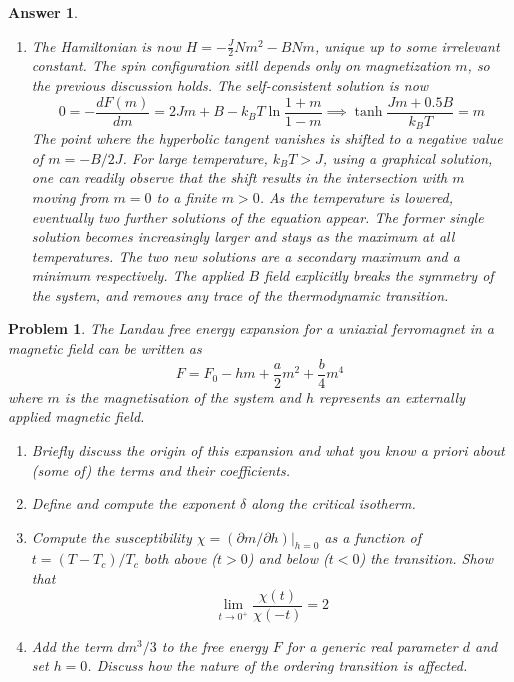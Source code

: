\documentclass[a4paper]{article}
\newtheorem{ans}{Answer}[section]
\theoremstyle{new}
\newtheorem{qns}{Problem}[section]
\begin{document}
\begin{ans}
\begin{enumerate}[label=(\alph*)]
\begin{align}
\end{align}
and so $\alpha(T)=k_BT-J=k_B(T-T_c)$, $\beta(T)=\frac{1}{3}k_BT$. $\alpha(T_c)=0$ indeed, with $\alpha>0$ above $m=0$ and $\alpha<0$ below $m=\pm m_0$.
\item The Hamiltonian is now $H=-\frac{J}{2}Nm^2-BNm$, unique up to some irrelevant constant. The spin configuration sitll depends only on magnetization $m$, so the previous discussion holds. The self-consistent solution is now
$$0=-\frac{dF(m)}{dm}=2Jm+B-k_BT\ln\frac{1+m}{1-m}\implies\tanh\frac{Jm+0.5B}{k_BT}=m$$
The point where the hyperbolic tangent vanishes is shifted to a negative value of $m=-B/2J$. For large temperature, $k_BT>J$, using a graphical solution, one can readily observe that the shift results in the intersection with $m$ moving from $m=0$ to a finite $m>0$. As the temperature is lowered, eventually two further solutions of the equation appear. The former single solution becomes increasingly larger and stays as the maximum at all temperatures. The two new solutions are a secondary maximum and a minimum respectively. The applied $B$ field explicitly breaks the symmetry of the system, and removes any trace of the thermodynamic transition.
\end{enumerate}
\end{ans}
\begin{qns}
The Landau free energy expansion for a uniaxial ferromagnet in a magnetic field can be written as
$$F=F_0-hm+\frac{a}{2}m^2+\frac{b}{4}m^4$$
where $m$ is the magnetisation of the system and $h$ represents an externally applied magnetic field.
\begin{enumerate}[label=(\alph*)]
\item Briefly discuss the origin of this expansion and what you know a priori about (some of) the terms and their coefficients.
\item Define and compute the exponent $\delta$ along the critical isotherm.
\item Compute the susceptibility $\chi=(\partial m/\partial h)|_{h=0}$ as a function of $t = (T − T_c)/T_c$ both above ($t > 0$) and below ($t < 0$) the transition. Show that
$$\lim_{t\rightarrow 0^+}\frac{\chi(t)}{\chi(-t)}=2$$
\item Add the term $dm^3/3$ to the free energy $F$ for a generic real parameter $d$ and set $h = 0$. Discuss how the nature of the ordering transition is affected.
\end{enumerate}
\end{qns}
\end{document}

